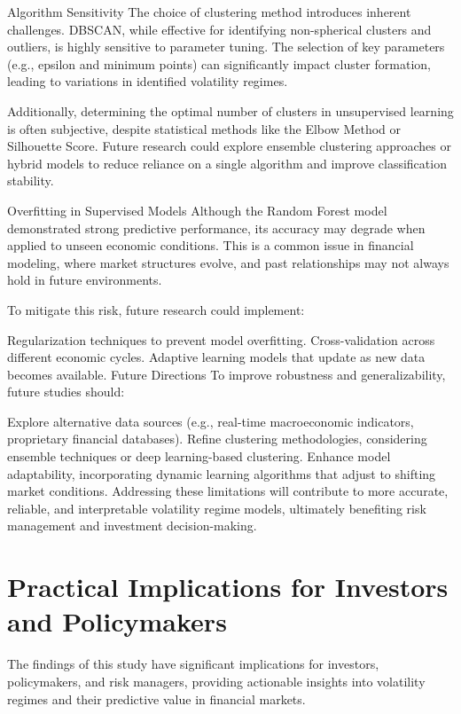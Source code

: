 Algorithm Sensitivity
The choice of clustering method introduces inherent challenges. DBSCAN, while effective for identifying non-spherical clusters and outliers, is highly sensitive to parameter tuning. The selection of key parameters (e.g., epsilon and minimum points) can significantly impact cluster formation, leading to variations in identified volatility regimes.

Additionally, determining the optimal number of clusters in unsupervised learning is often subjective, despite statistical methods like the Elbow Method or Silhouette Score. Future research could explore ensemble clustering approaches or hybrid models to reduce reliance on a single algorithm and improve classification stability.

Overfitting in Supervised Models
Although the Random Forest model demonstrated strong predictive performance, its accuracy may degrade when applied to unseen economic conditions. This is a common issue in financial modeling, where market structures evolve, and past relationships may not always hold in future environments.

To mitigate this risk, future research could implement:

Regularization techniques to prevent model overfitting.
Cross-validation across different economic cycles.
Adaptive learning models that update as new data becomes available.
Future Directions
To improve robustness and generalizability, future studies should:

Explore alternative data sources (e.g., real-time macroeconomic indicators, proprietary financial databases).
Refine clustering methodologies, considering ensemble techniques or deep learning-based clustering.
Enhance model adaptability, incorporating dynamic learning algorithms that adjust to shifting market conditions.
Addressing these limitations will contribute to more accurate, reliable, and interpretable volatility regime models, ultimately benefiting risk management and investment decision-making.

\section{Practical Implications for Investors and Policymakers}

The findings of this study have significant implications for investors, policymakers, and risk managers, providing actionable insights into volatility regimes and their predictive value in financial markets.

